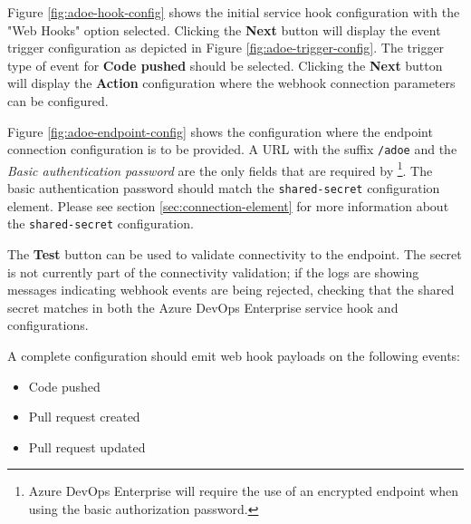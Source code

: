 Figure \ref{fig:adoe-hook-config} shows the initial service hook configuration with the 
"Web Hooks" option selected.  Clicking the \textbf{Next} button will display the 
event trigger configuration as depicted in Figure \ref{fig:adoe-trigger-config}. 
The trigger type of event for \textbf{Code pushed} should be selected.
Clicking the \textbf{Next} button will display the \textbf{Action} configuration
where the webhook connection parameters can be configured.

Figure \ref{fig:adoe-endpoint-config} shows the configuration where the \cxoneflow
endpoint connection configuration is to be provided.  A URL with the suffix
\texttt{/adoe} and the \textit{Basic authentication password} are the only
fields that are required by \cxoneflow\footnote{Azure DevOps Enterprise will require
the use of an encrypted endpoint when using the basic authorization password.}.
The basic authentication password should match the \texttt{shared-secret} \cxoneflow
configuration element.  Please see section \ref{sec:connection-element}
for more information about the \texttt{shared-secret} configuration.

The \textbf{Test} button can be used to validate connectivity to the \cxoneflow endpoint.
The secret is not currently part of the connectivity validation; if the \cxoneflow logs
are showing messages indicating webhook events are being rejected, checking that the
shared secret matches in both the Azure DevOps Enterprise service hook and \cxoneflow
configurations.

A complete configuration should emit web hook payloads on the following events:

\begin{itemize}
    \item Code pushed
    \item Pull request created
    \item Pull request updated
\end{itemize}

